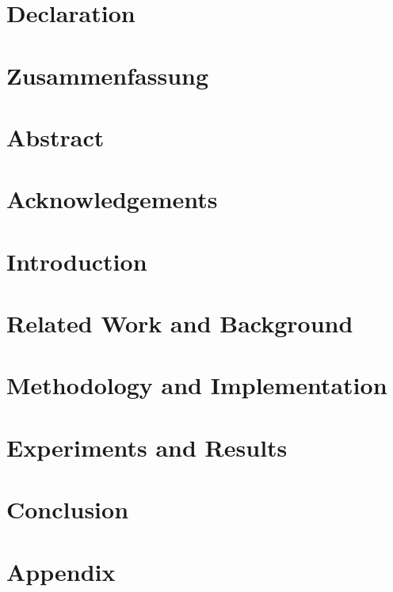 \documentclass[12pt]{report}
\begin{document}

\chapter*{Declaration}
    

\chapter*{Zusammenfassung}
    

\chapter*{Abstract}
    

    
\chapter*{Acknowledgements}
    


\tableofcontents
\listoffigures
\listoftables

\chapter{Introduction}
    

\chapter{Related Work and Background}
    
    
    
\chapter{Methodology and Implementation}
    
    

\chapter{Experiments and Results}
    
    
    
\chapter{Conclusion}
    

\chapter{Appendix}


\printbibliography %
\end{document}
